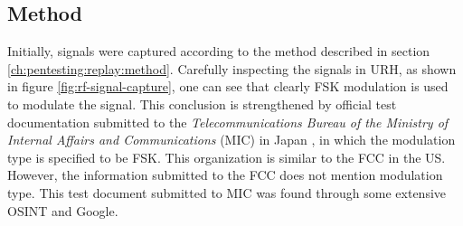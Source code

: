 \subsection{Method}
Initially, signals were captured according to the method described in section \ref{ch:pentesting:replay:method}. Carefully inspecting the signals in \gls{URH}, as shown in figure \ref{fig:rf-signal-capture}, one can see that clearly \gls{FSK} modulation is used to modulate the signal. This conclusion is strengthened by official test documentation submitted to the \textit{Telecommunications Bureau of the Ministry of Internal Affairs and Communications} (MIC) in Japan , in which the modulation type is specified to be FSK. This organization is similar to the FCC in the US. However, the information submitted to the FCC does not mention modulation type. This test document submitted to MIC was found through some extensive \gls{OSINT} and Google.


